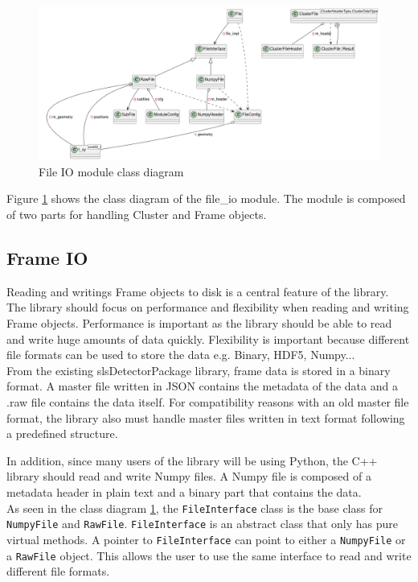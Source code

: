 \begin{spacing}{1.2}
    \begin{figure}
        \centering
        \includegraphics[width=\textwidth]{Chapitre3/figures/file_io_class.png}
        \caption{File IO module class diagram}
        \label{fig:file_io_class}
    \end{figure}
    Figure \ref{fig:file_io_class} shows the class diagram of the file\_io module.
    The module is composed of two parts for handling Cluster  and Frame objects.\\

    \subsection{Frame IO}
    Reading and writings Frame objects to disk is a central feature of the library. The library
    should focus on performance and flexibility when reading and writing Frame objects.
    Performance is important as the library should be able to read and write huge amounts of data
    quickly. Flexibility is important because different file formats can be used to store the data e.g.
    Binary, HDF5, Numpy...\\

    From the existing slsDetectorPackage library, frame data is stored in a binary format.
    A master file written in JSON contains the metadata of the data and a .raw file contains the data itself.
    For compatibility reasons with an old master file format, the library also must handle master files written in text
    format following a predefined structure.

    In addition, since many users of the library will be using Python, the C++ library should
    read and write Numpy files. A Numpy file is composed of a metadata header in plain text and
    a binary part that contains the data.\\

    As seen in the class diagram \ref{fig:file_io_class}, the \lstinline|FileInterface| class
    is the base class for \lstinline|NumpyFile| and \lstinline|RawFile|. \lstinline|FileInterface|
    is an abstract class that only has pure virtual methods. A pointer to \lstinline|FileInterface|
    can point to either a \lstinline|NumpyFile| or a \lstinline|RawFile| object. This allows the
    user to use the same interface to read and write different file formats.


\end{spacing}
